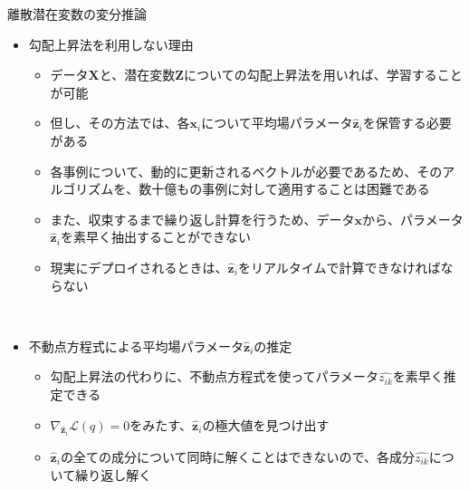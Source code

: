 \documentclass[dvipdfmx,notheorems,t]{beamer}
\begin{document}
\begin{frame}{離散潜在変数の変分推論}
\begin{itemize}
\begin{itemize}
		\item この式には\alert{あまり美的魅力がない}(Somewhat unappealing aesthetically)が、事後分布よりは計算しやすい
		\item 事後分布$\ln p(\bm{Z} | \bm{X})$を最大化する代わりに、上記の下界$\mathcal{L}(q)$を$q$について最大化することができる
		\newline
		\item データ$\bm{x}_i$に対するパラメータ$\left\{ \widehat{z_{i1}}, \ldots, \widehat{z_{iK}} \right\}$をまとめて、\color{red}ベクトル$\widehat{\bm{z}}_i$として記述\normalcolor する
		\item パラメータ$\widehat{\bm{z}}_i = \left[ \widehat{z_{i1}}, \ldots, \widehat{z_{iK}} \right]^T$は、データ$\bm{x}_i$に対応する潜在変数$\bm{z}$の各要素が、$1$となる確率を集めたベクトルである
		\newline
		\item $\widehat{z_{ik}} = q(z_{ik} = 1 | \bm{x}_i)$と定義されていることに注意
		\newline
		\item よってベクトル$\widehat{\bm{z}}_i$は、データ$\bm{x}_i$に対応する\alert{二値のスパース符号}である
	\end{itemize} \
	
	\item 勾配上昇法を利用しない理由
	\begin{itemize}
		\item データ$\bm{X}$と、潜在変数$\bm{Z}$についての勾配上昇法を用いれば、学習することが可能
		\item 但し、その方法では、\color{red}各$\bm{x}_i$について\alert{平均場パラメータ}$\widehat{\bm{z}}_i$を保管する必要\normalcolor がある
		\item \alert{各事例について、動的に更新されるベクトルが必要}であるため、そのアルゴリズムを、数十億もの事例に対して適用することは困難である
		\newline
		\item また、\alert{収束するまで繰り返し計算を行う}ため、データ$\bm{x}$から、パラメータ$\widehat{\bm{z}}_i$を素早く抽出することができない
		\item 現実にデプロイされるときは、$\widehat{\bm{z}}_i$をリアルタイムで計算できなければならない
	\end{itemize} \
	
	\item \alert{不動点方程式}による平均場パラメータ$\widehat{\bm{z}}_i$の推定
	\begin{itemize}
		\item 勾配上昇法の代わりに、不動点方程式を使ってパラメータ$\widehat{z_{ik}}$を素早く推定できる
		\newline
		\item $\nabla_{\widehat{\bm{z}}_i} \mathcal{L}(q) = 0$をみたす、$\widehat{\bm{z}}_i$の極大値を見つけ出す
		\item $\widehat{\bm{z}}_i$の全ての成分について同時に解くことはできないので、各成分$\widehat{z_{ik}}$について繰り返し解く
		\newline
		

\end{itemize}
\end{itemize}
\end{frame}
\end{document}

